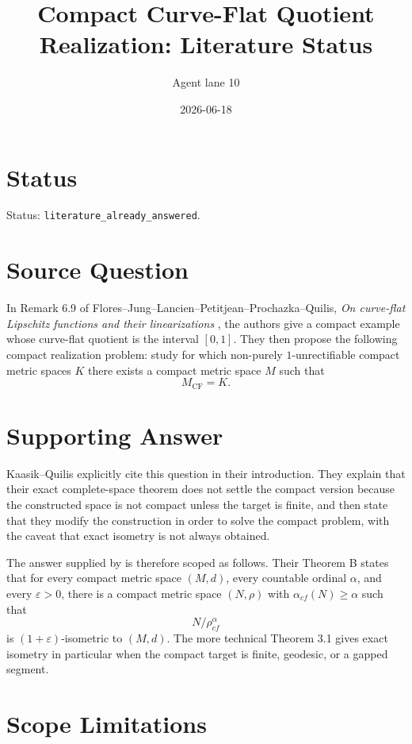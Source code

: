 \documentclass[11pt]{amsart}
\title{Compact Curve-Flat Quotient Realization: Literature Status}
\author{Agent lane 10}
\date{2026-06-18}
\newcommand{\CF}{\mathrm{CF}}
\begin{document}
\maketitle

\section*{Status}

Status: \texttt{literature\_already\_answered}.

\section*{Source Question}

In Remark 6.9 of Flores--Jung--Lancien--Petitjean--Prochazka--Quilis,
\emph{On curve-flat Lipschitz functions and their linearizations}
\cite{FJLPPQ2024}, the authors give a compact example whose
curve-flat quotient is the interval $[0,1]$. They then propose the
following compact realization problem: study for which non-purely
$1$-unrectifiable compact metric spaces $K$ there exists a compact
metric space $M$ such that
\[
        M_{\CF}=K .
\]

\section*{Supporting Answer}

Kaasik--Quilis \cite{KQ2026} explicitly cite this question in their
introduction. They explain that their exact complete-space theorem
does not settle the compact version because the constructed space is
not compact unless the target is finite, and then state that they
modify the construction in order to solve the compact problem, with
the caveat that exact isometry is not always obtained.

The answer supplied by \cite{KQ2026} is therefore scoped as follows.
Their Theorem B states that for every compact metric space $(M,d)$,
every countable ordinal $\alpha$, and every $\varepsilon>0$, there is a
compact metric space $(N,\rho)$ with $\alpha_{cf}(N)\geq\alpha$ such
that
\[
        N/\rho_{cf}^{\alpha}
\]
is $(1+\varepsilon)$-isometric to $(M,d)$. The more technical Theorem
3.1 gives exact isometry in particular when the compact target is
finite, geodesic, or a gapped segment.

\section*{Scope Limitations}
\end{document}
